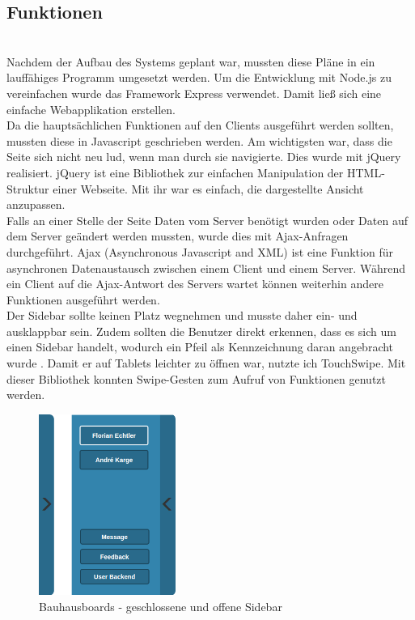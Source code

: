 \subsection{Funktionen}\label{Funktionen}
\\
Nachdem der Aufbau des Systems geplant war, mussten diese Pläne in ein lauffähiges Programm umgesetzt werden.
Um die Entwicklung mit Node.js zu vereinfachen wurde das Framework Express\cite{express:website} verwendet. Damit ließ sich eine einfache Webapplikation erstellen.
\\
Da die hauptsächlichen Funktionen auf den Clients ausgeführt werden sollten, mussten diese in Javascript geschrieben werden.
Am wichtigsten war, dass die Seite sich nicht neu lud, wenn man durch sie navigierte. Dies wurde mit jQuery\cite{jquery:website} realisiert. jQuery ist eine Bibliothek zur einfachen Manipulation der HTML-Struktur einer Webseite. Mit ihr war es einfach, die dargestellte Ansicht anzupassen.
\\
Falls an einer Stelle der Seite Daten vom Server benötigt wurden oder Daten auf dem Server geändert werden mussten, wurde dies mit Ajax-Anfragen durchgeführt. Ajax (Asynchronous Javascript and XML) ist eine Funktion für asynchronen Datenaustausch zwischen einem Client und einem Server.
Während ein Client auf die Ajax-Antwort des Servers wartet können weiterhin andere Funktionen ausgeführt werden.
\\
Der Sidebar sollte keinen Platz wegnehmen und musste daher ein- und ausklappbar sein. Zudem sollten die Benutzer direkt erkennen, dass es sich um einen Sidebar handelt, wodurch ein Pfeil als Kennzeichnung daran angebracht wurde .
Damit er auf Tablets leichter zu öffnen war, nutzte ich TouchSwipe\cite{touchswipe:website}. Mit dieser Bibliothek konnten Swipe-Gesten zum Aufruf von Funktionen genutzt werden.
\begin{figure}[h!]
  \centering
    \includegraphics[width=0.4\textwidth]{./img/Sidebar.png}
  \caption{Bauhausboards - geschlossene und offene Sidebar}
  \label{img:sidebar}
\end{figure}
